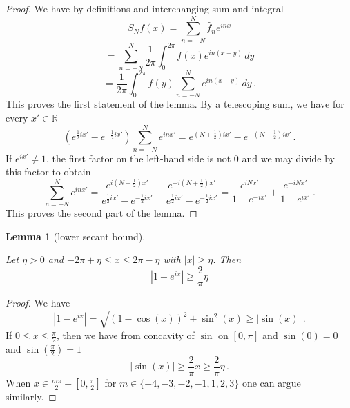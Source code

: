 \documentclass[10pt,a4paper]{article}
\theoremstyle{plain}
\newtheorem{lemma}[theorem]{Lemma}
\theoremstyle{definition}
\numberwithin{equation}{subsection}
\newcommand{\R}{{\mathbb{R}}}
\newcommand{\lean}[1]{}
\newcommand{\leanok}{}
\begin{document}
\begin{proof}
\leanok
We have by definitions and interchanging sum and integral
   \begin{equation*}
        S_Nf(x)=\sum_{n=-N}^N \widehat{f}_n e^{inx}
    \end{equation*}
       \begin{equation*}
    =\sum_{n=-N}^N \frac 1{2\pi}\int_{0}^{2\pi}
    f(x) e^{in(x-y)}\, dy
    \end{equation*}
 \begin{equation}\label{eq-expsum}
     =\frac 1{2\pi}\int_{0}^{2\pi}
    f(y) \sum_{n=-N}^N e^{in(x-y)}\, dy\, .
 \end{equation}
This proves the first statement of the lemma.
By a telescoping sum, we have for every $x'\in \R$
\begin{equation}
    \left( e^{\frac 12 ix'}-e^{-\frac 12 ix'}\right) \sum_{n=-N}^N e^{inx'}= e^{(N+\frac 12) ix'}-e^{-(N+\frac 12) ix'}\, .
\end{equation}
If $e^{ix'}\neq 1$, the first factor on the left-hand side is not $0$ and we may divide by this factor to obtain
\begin{equation}
      \sum_{n=-N}^N e^{inx'}= \frac{e^{i(N+\frac 1 2)x'}}{e^{\frac 12 ix'}-e^{-\frac 12ix'}}
      -\frac{e^{-i(N+\frac 1 2)x'}}{e^{\frac 12 ix'}-e^{-\frac 12ix'}}
       =\frac{e^{iNx'}}{1-e^{-ix'}}
      +\frac {e^{-iNx'}}{1-e^{ix'}}\, .
\end{equation}
This proves the second part of the lemma.
\end{proof}

\begin{lemma}[lower secant bound]
    \label{lower-secant-bound}
    \leanok
    \lean{lower_secant_bound'}
    Let $\eta>0$ and $-2\pi +\eta \le x\le 2\pi-\eta$ with $|x|\ge \eta$. Then
    \begin{equation}
        |1-e^{ix}|\ge \frac{2}{\pi} \eta
    \end{equation}
\end{lemma}
\begin{proof}
    \leanok
    We have
    $$
        |1 - e^{ix}| = \sqrt{(1 - \cos(x))^2 + \sin^2(x)} \ge |\sin(x)|\,.
    $$
    If $0 \le x \le \frac{\pi}{2}$, then we have from concavity of $\sin$ on $[0, \pi]$ and $\sin(0) = 0$ and $\sin(\frac{\pi}{2}) = 1$
    $$
        |\sin(x)| \ge \frac{2}{\pi} x \ge \frac{2}{\pi} \eta\,.
    $$
    When $x\in \frac{m\pi}{2} + [0, \frac{\pi}{2}]$ for $m \in \{-4, -3, -2, -1, 1, 2, 3\}$ one can argue similarly.
\end{proof}
\end{document}
